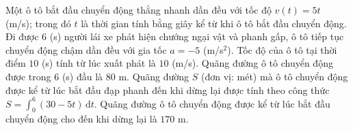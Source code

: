 \begin{ex}
Một ô tô bắt đầu chuyển động thẳng nhanh dần đều với tốc độ $v(t)=5t$ (m/s); trong đó $t$ là thời gian tính bằng giây kể từ khi ô tô bắt đầu chuyển động. Đi được $6$ (s) người lái xe phát hiện chướng ngại vật và phanh gấp, ô tô tiếp tục chuyển động chậm dần đều với gia tốc $a=-5$ (m/s$^2$).
\choiceTF
{\True Tốc độ của ô tô tại thời điểm $10$ (s) tính từ lúc xuất phát là $10$ (m/s).}
{Quãng đường ô tô chuyển động được trong $6$ (s) đầu là $80$ m.}
{\True Quãng đường $S$ (đơn vị: mét) mà ô tô chuyển động được kể từ lúc bắt đầu đạp phanh đến khi dừng lại được tính theo công thức $S=\displaystyle\int_0^6(30-5t)\,\mathrm dt$.}
{Quãng đường ô tô chuyển động được kể từ lúc bắt đầu chuyển động cho đến khi dừng lại là $170$ m.}
\end{ex}
